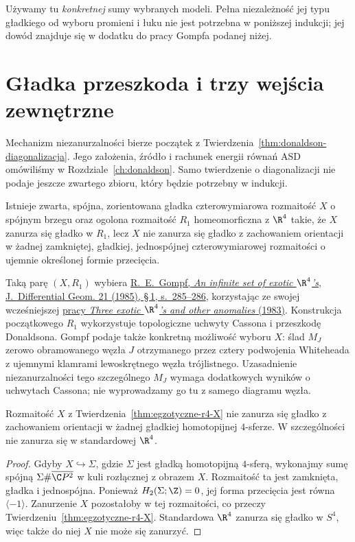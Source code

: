 Używamy tu \emph{konkretnej} sumy wybranych
modeli. Pełna niezależność jej typu gładkiego
od wyboru promieni i łuku nie jest potrzebna
w poniższej indukcji; jej dowód znajduje się
w dodatku do pracy Gompfa podanej niżej.

\section{Gładka przeszkoda i trzy wejścia zewnętrzne}
\label{sec:egzotyczne-r4-wejscia}

Mechanizm niezanurzalności bierze początek z
Twierdzenia~\ref{thm:donaldson-diagonalizacja}.
Jego założenia, źródło i rachunek energii równań ASD
omówiliśmy w Rozdziale~\ref{ch:donaldson}.
Samo twierdzenie o
diagonalizacji nie podaje jeszcze zwartego zbioru,
który będzie potrzebny w indukcji.

\begin{twierdzenie}
\label{thm:egzotyczne-r4-X}
Istnieje zwarta, spójna, zorientowana gładka
czterowymiarowa rozmaitość $X$ o spójnym brzegu
oraz ogolona rozmaitość $R_1$ homeomorficzna
z $\R^4$ takie, że $X$ zanurza się gładko w $R_1$,
lecz $X$ nie zanurza się gładko z zachowaniem
orientacji w żadnej zamkniętej, gładkiej,
jednospójnej czterowymiarowej rozmaitości
o ujemnie określonej formie przecięcia.
\end{twierdzenie}

Taką parę $(X,R_1)$ wybiera
\href{https://doi.org/10.4310/jdg/1214439566}
{R.~E.~Gompf, \emph{An infinite set of exotic
$\R^4$'s}, J.~Differential Geom. 21 (1985),
\S\,1, s.~285--286}, korzystając ze swojej wcześniejszej
\href{https://doi.org/10.4310/jdg/1214437666}
{pracy \emph{Three exotic $\R^4$'s and other
anomalies} (1983)}. Konstrukcja początkowego
$R_1$ wykorzystuje topologiczne uchwyty Cassona
i przeszkodę Donaldsona. Gompf podaje także
konkretną możliwość wyboru $X$: ślad $M_J$
zerowo obramowanego węzła $J$ otrzymanego przez
cztery podwojenia Whiteheada z ujemnymi klamrami
lewoskrętnego węzła trójlistnego. Uzasadnienie
niezanurzalności tego szczególnego $M_J$ wymaga
dodatkowych wyników o uchwytach Cassona; nie
wyprowadzamy go tu z samego diagramu węzła.

\begin{stwierdzenie}
\label{prop:egzotyczne-r4-X-konsekwencje}
Rozmaitość $X$ z
Twierdzenia~\ref{thm:egzotyczne-r4-X} nie zanurza
się gładko z zachowaniem orientacji w żadnej
gładkiej homotopijnej $4$-sferze. W szczególności
nie zanurza się w standardowej $\R^4$.
\end{stwierdzenie}
\begin{proof}
Gdyby $X\hookrightarrow\Sigma$, gdzie $\Sigma$
jest gładką homotopijną $4$-sferą, wykonajmy
sumę spójną $\Sigma\#\overline{\C P^2}$
w kuli rozłącznej z obrazem $X$. Rozmaitość
ta jest zamknięta, gładka i jednospójna.
Ponieważ $H_2(\Sigma;\Z)=0$, jej forma przecięcia
jest równa $\langle-1\rangle$. Zanurzenie $X$
pozostałoby w tej rozmaitości, co przeczy
Twierdzeniu~\ref{thm:egzotyczne-r4-X}.
Standardowa $\R^4$ zanurza się gładko w $S^4$,
więc także do niej $X$ nie może się zanurzyć.
\end{proof}

